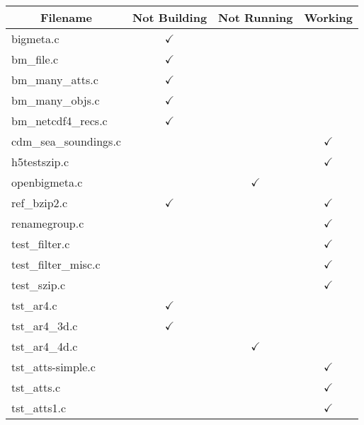 \begin{table}[H]
\centering
\begin{tabular}{|l|c|c|c|}
\hline
\multicolumn{1}{|c|}{\parbox{6cm}{\centering Filename}} & \multicolumn{1}{c|}{Not Building} & \multicolumn{1}{c|}{Not Running} & \multicolumn{1}{c|}{Working} \\ \hline \hline
bigmeta.c               & $\checkmark$  &             &                 \\ \hline
bm\_file.c              & $\checkmark$  &             &                 \\ \hline
bm\_many\_atts.c        & $\checkmark$  &             &                 \\ \hline
bm\_many\_objs.c        & $\checkmark$  &             &                 \\ \hline
bm\_netcdf4\_recs.c     & $\checkmark$  &             &                 \\ \hline
cdm\_sea\_soundings.c   &               &             & $\checkmark$    \\ \hline
h5testszip.c            &               &             & $\checkmark$    \\ \hline
openbigmeta.c           &               & $\checkmark$ &                \\ \hline
ref\_bzip2.c            & $\checkmark$  &             & $\checkmark$    \\ \hline
renamegroup.c           &               &             & $\checkmark$    \\ \hline
test\_filter.c          &               &             & $\checkmark$    \\ \hline
test\_filter\_misc.c    &               &             & $\checkmark$    \\ \hline
test\_szip.c            &               &             & $\checkmark$    \\ \hline
tst\_ar4.c              & $\checkmark$  &             &                \\ \hline
tst\_ar4\_3d.c          & $\checkmark$  &             &                 \\ \hline
tst\_ar4\_4d.c          &               & $\checkmark$ &                \\ \hline
tst\_atts-simple.c      &               &             & $\checkmark$    \\ \hline
tst\_atts.c             &               &             & $\checkmark$    \\ \hline
tst\_atts1.c            &               &             & $\checkmark$    \\ \hline

\end{tabular}
\end{table}
